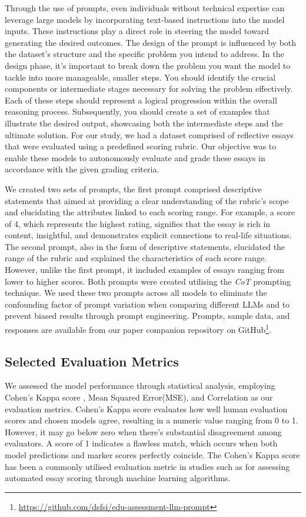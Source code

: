 \documentclass{article}
\begin{document}
Through the use of prompts, even individuals without technical expertise can leverage large models by incorporating text-based instructions into the model inputs. These instructions play a direct role in steering the model toward generating the desired outcomes. The design of the prompt is influenced by both the dataset's structure and the specific problem you intend to address. In the design phase, it's important to break down the problem you want the model to tackle into more manageable, smaller steps. You should identify the crucial components or intermediate stages necessary for solving the problem effectively. Each of these steps should represent a logical progression within the overall reasoning process. Subsequently, you should create a set of examples that illustrate the desired output, showcasing both the intermediate steps and the ultimate solution. For our study, we had a dataset comprised of reflective essays that were evaluated using a predefined scoring rubric. Our objective was to enable these models to autonomously evaluate and grade these essays in accordance with the given grading criteria. 

We created two sets of prompts, the first prompt comprised descriptive statements that aimed at providing a clear understanding of the rubric's scope and elucidating the attributes linked to each scoring range. For example, a score of 4, which represents the highest rating, signifies that the essay is rich in content, insightful, and demonstrates explicit connections to real-life situations. The second prompt, also in the form of descriptive statements, elucidated the range of the rubric and explained the characteristics of each score range. However, unlike the first prompt, it included examples of essays ranging from lower to higher scores. Both prompts were created utilising the \textit{CoT} prompting technique. We used these two prompts across all models to eliminate the confounding factor of prompt variation when comparing different LLMs and to prevent biased results through prompt engineering. Prompts, sample data, and responses are available from our paper companion repository on GitHub\footnote{\url{https://github.com/dsfsi/edu-assessment-llm-prompt}}.

\subsection {Selected Evaluation Metrics}
We assessed the model performance through statistical analysis, employing Cohen's Kappa score \cite{vieira2010cohen}, Mean Squared Error(MSE), and Correlation as our evaluation metrics. Cohen's Kappa score evaluates how well human evaluation scores and chosen models agree, resulting in a numeric value ranging from 0 to 1. However, it may go below zero when there's substantial disagreement among evaluators. A score of 1 indicates a flawless match, which occurs when both model predictions and marker scores perfectly coincide. The Cohen's Kappa score has been a commonly utilised evaluation metric in studies such as \cite{doewes2023evaluating} for assessing automated essay scoring through machine learning algorithms. 
\end{document}
